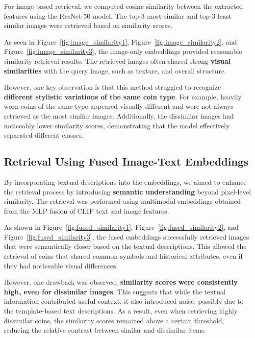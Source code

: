 \documentclass[nolibertine, english, algorithm, nomencl, minted]{ttlab-qualify}
\begin{document}
For image-based retrieval, we computed cosine similarity between the extracted features using the ResNet-50 model. 
The top-3 most similar and top-3 least similar images were retrieved based on similarity scores.

As seen in Figure~\ref{fig:image_similarity1}, Figure~\ref{fig:image_similarity2}, and Figure~\ref{fig:image_similarity3}, 
the image-only embeddings provided reasonable similarity retrieval results. 
The retrieved images often shared strong \textbf{visual similarities} with the query image, 
such as texture, and overall structure. 

However, one key observation is that this method struggled to recognize \textbf{different stylistic variations of the same coin type}. 
For example, heavily worn coins of the same type appeared visually different and were not always retrieved as the most similar images. 
Additionally, the dissimilar images had noticeably lower similarity scores, demonstrating that the model effectively separated 
different classes.

\subsection{Retrieval Using Fused Image-Text Embeddings}
\label{subsec:fused_retrieval}

By incorporating textual descriptions into the embeddings, 
we aimed to enhance the retrieval process by introducing \textbf{semantic understanding} 
beyond pixel-level similarity. The retrieval was performed using multimodal embeddings obtained from the MLP fusion 
of CLIP text and image features.

As shown in Figure~\ref{fig:fused_similarity1}, Figure~\ref{fig:fused_similarity2}, and Figure~\ref{fig:fused_similarity3}, 
the fused embeddings successfully retrieved images that were semantically closer based on the textual descriptions. 
This allowed the retrieval of coins that shared common symbols and historical attributes, 
even if they had noticeable visual differences.

However, one drawback was observed: \textbf{similarity scores were consistently high, even for dissimilar images}. 
This suggests that while the textual information contributed useful context, it also introduced noise, possibly due to 
the template-based text descriptions. As a result, even when retrieving highly dissimilar coins, 
the similarity scores remained above a certain threshold, reducing the relative contrast between similar and dissimilar items.
\end{document}
